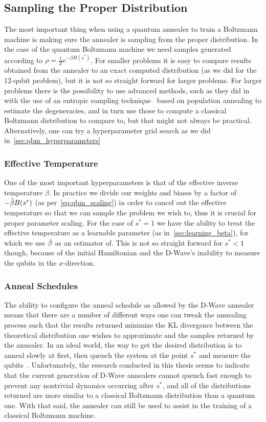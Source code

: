 \subsection{Sampling the Proper Distribution}
The most important thing when using a quantum annealer to train a Boltzmann machine is making sure the annealer is sampling from the proper distribution.
In the case of the quantum Boltzmann machine we need samples generated according to \( \rho = \frac{1}{Z} e^{-\beta H(s^*)} \).
For smaller problems it is easy to compare results obtained from the annealer to an exact computed distribution (as we did for the 12-qubit problem), but it is not so straight forward for larger problems.
For larger problems there is the possibility to use advanced methods, such as they did in~\cite{marshall_2019} with the use of an entropic sampling technique~\cite{barash_2019} based on population annealing to estimate the degeneracies, and in turn use those to compute a classical Boltzmann distribution to compare to, but that might not always be practical.
Alternatively, one can try a hyperparameter grid search as we did in~\cref{sec:qbm_hyperparameters}

\subsubsection{Effective Temperature}
One of the most important hyperparameters is that of the effective inverse temperature \( \beta \).
In practice we divide our weights and biases by a factor of \( -\hat{\beta} B(s^*) \) (as per~\cref{eq:qbm_scaling}) in order to cancel out the effective temperature so that we can sample the problem we wish to, thus it is crucial for proper parameter scaling.
For the case of \( s^* = 1 \) we have the ability to treat the effective temperature as a learnable parameter (as in~\cref{sec:learning_beta}), for which we use \( \hat{\beta} \) as an estimator of.
This is not so straight forward for \( s^* < 1 \) though, because of the initial Hamiltonian and the D-Wave's inability to measure the qubits in the \( x \)-direction.

\subsubsection{Anneal Schedules}
The ability to configure the anneal schedule as allowed by the D-Wave annealer means that there are a number of different ways one can tweak the annealing process such that the results returned minimize the KL divergence between the theoretical distribution one wishes to approximate and the samples returned by the annealer.
In an ideal world, the way to get the desired distribution is to anneal slowly at first, then quench the system at the point \( s^* \) and measure the qubits~\cite{amin_2018}.
Unfortunately, the research conducted in this thesis seems to indicate that the current generation of D-Wave annealers cannot quench fast enough to prevent any nontrivial dynamics occurring after \( s^* \), and all of the distributions returned are more similar to a classical Boltzmann distribution than a quantum one.
With that said, the annealer can still be used to assist in the training of a classical Boltzmann machine.

